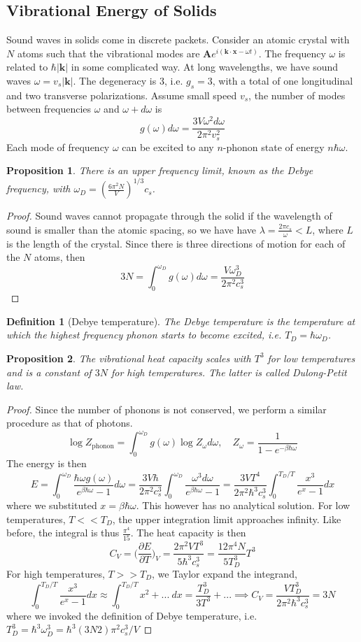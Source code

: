 \documentclass[a4paper]{article}
\theoremstyle{new}
\newtheorem{defi}{Definition}[section]
\newtheorem{prop}{Proposition}[section]
\begin{document}
\subsection{Vibrational Energy of Solids}
Sound waves in solids come in discrete packets. Consider an atomic crystal with $N$ atoms such that the vibrational modes are $\mathbf{A}e^{i(\mathbf{k}\cdot\mathbf{x}-\omega t)}$. The frequency $\omega$ is related to $\hbar|\mathbf{k}|$ in some complicated way. At long wavelengths, we have sound waves $\omega=v_s|\mathbf{k}|$. The degeneracy is 3, i.e. $g_s=3$, with a total of one longitudinal and two transverse polarizations. Assume small speed $v_s$, the number of modes between frequencies $\omega$ and $\omega+d\omega$ is
$$g(\omega)d\omega=\frac{3V\omega^2d\omega}{2\pi^2v_s^2}$$
Each mode of frequency $\omega$ can be excited to any $n$-phonon state of energy $n\hbar\omega$. 
\begin{prop}
There is an upper frequency limit, known as the Debye frequency, with $\omega_D=(\frac{6\pi^2N}{V})^{1/3}c_s$.
\end{prop}
\begin{proof}
Sound waves cannot propagate through the solid if the wavelength of sound is smaller than the atomic spacing, so we have have $\lambda=\frac{2\pi c_s}{\omega}<L$, where $L$ is the length of the crystal. Since there is three directions of motion for each of the $N$ atoms, then 
$$3N=\int_0^{\omega_D}g(\omega)d\omega=\frac{V\omega_D^3}{2\pi^2c_s^3}$$
\end{proof}
\begin{defi}[Debye temperature]
The Debye temperature is the temperature at which the highest frequency phonon starts to become excited, i.e. $T_D=\hbar\omega_D$.
\end{defi}
\begin{prop}
The vibrational heat capacity scales with $T^3$ for low temperatures and is a constant of $3N$ for high temperatures. The latter is called Dulong-Petit law.
\end{prop}
\begin{proof}
Since the number of phonons is not conserved, we perform a similar procedure as that of photons.
$$\log Z_{\text{phonon}}=\int_0^{\omega_D}g(\omega)\log Z_\omega d\omega,\quad Z_\omega=\frac{1}{1-e^{-\beta\hbar\omega}}$$
The energy is then
$$E=\int_0^{\omega_D}\frac{\hbar\omega g(\omega)}{e^{\beta\hbar\omega}-1}d\omega=\frac{3V\hbar}{2\pi^2c_s^3}\int_0^{\omega_D}\frac{\omega^3d\omega}{e^{\beta\hbar\omega}-1}=\frac{3VT^4}{2\pi^2\hbar^3c_s^3}\int_0^{T_D/T}\frac{x^3}{e^x-1}dx$$
where we substituted $x=\beta\hbar\omega$. This however has no analytical solution. For low temperatures, $T<<T_D$, the upper integration limit approaches infinity. Like before, the integral is thus $\frac{\pi^4}{15}$. The heat capacity is then
$$C_V=\bigg(\frac{\partial E}{\partial T}\bigg)_V=\frac{2\pi^2VT^3}{5\hbar^3c_s^3}=\frac{12\pi^4N}{5T_D^3}T^3$$
For high temperatures, $T>>T_D$, we Taylor expand the integrand,
$$\int_0^{T_D/T}\frac{x^3}{e^x-1}dx\approx\int_0^{T_D/T}x^2+...~dx=\frac{T_D^3}{3T^3}+...\implies C_V=\frac{VT_D^3}{2\pi^2\hbar^3c_s^3}=3N$$
where we invoked the definition of Debye temperature, i.e. $T_D^3=\hbar^3\omega_D^3=\hbar^3(3N2)\pi^2c_s^3/V$
\end{proof}
\end{document}
